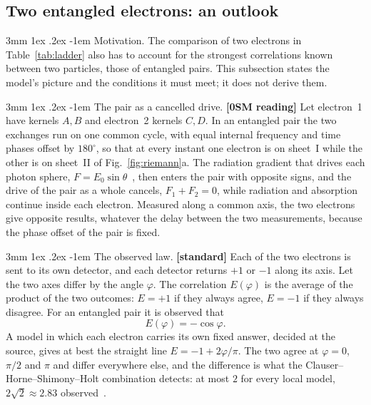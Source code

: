 \documentclass[%
 reprint, amsmath,amssymb, aps, prb, ]{revtex4-2}
\makeatletter
\numberwithin{equation}{section}
\renewcommand\paragraph{%
  \@startsection{paragraph}{4}{\z@}%
    {3mm \@plus 1ex \@minus .2ex}
    {-1em}
    {\normalfont\normalsize\itshape}}
\makeatother
\begin{document}
\subsection{Two entangled electrons: an outlook}
\label{sec:entangle}

\paragraph{Motivation.} The comparison of two electrons in Table~\ref{tab:ladder} also has to account for the strongest correlations known between two particles, those of entangled pairs. This subsection states the model's picture and the conditions it must meet; it does not derive them.

\paragraph{The pair as a cancelled drive.} \textbf{[0SM reading]} Let electron~1 have kernels $A,B$ and electron~2 kernels $C,D$. In an entangled pair the two exchanges run on one common cycle, with equal internal frequency and time phases offset by $180^\circ$, so that at every instant one electron is on sheet~I while the other is on sheet~II of Fig.~\ref{fig:riemann}a. The radiation gradient that drives each photon sphere, $F=E_0\sin\theta$~\cite{ref:p1}, then enters the pair with opposite signs, and the drive of the pair as a whole cancels, $F_1+F_2=0$, while radiation and absorption continue inside each electron. Measured along a common axis, the two electrons give opposite results, whatever the delay between the two measurements, because the phase offset of the pair is fixed.

\paragraph{The observed law.} \textbf{[standard]} Each of the two electrons is sent to its own detector, and each detector returns $+1$ or $-1$ along its axis. Let the two axes differ by the angle $\varphi$. The correlation $E(\varphi)$ is the average of the product of the two outcomes: $E=+1$ if they always agree, $E=-1$ if they always disagree. For an entangled pair it is observed that
\begin{equation}
E(\varphi)=-\cos\varphi .
\label{eq:Eobs}
\end{equation}
A model in which each electron carries its own fixed answer, decided at the source, gives at best the straight line $E=-1+2\varphi/\pi$. The two agree at $\varphi=0$, $\pi/2$ and $\pi$ and differ everywhere else, and the difference is what the Clauser--Horne--Shimony--Holt combination detects: at most $2$ for every local model, $2\sqrt2\approx2.83$ observed~\cite{ref:chsh,ref:aspect82}.
\end{document}
